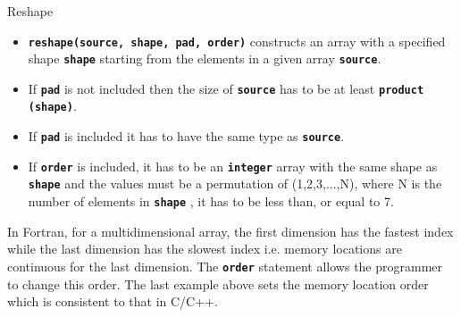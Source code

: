 \documentclass[slidestop,mathserif,compress,xcolor=svgnames]{beamer}
\newcommand{\bftt}[1]{\textbf{\texttt{#1}}}
\newenvironment{ablock}[0]
{
\begin{beamerboxesrounded}[upper=uppercol,lower=lowercol,shadow=true]}
{\end{beamerboxesrounded}}
\newenvironment{eblock}[0]
{
\begin{beamerboxesrounded}[upper=uppercol2,lower=lowercol2,shadow=true]}
{\end{beamerboxesrounded}}
\begin{document}
\begin{frame}[fragile]
  \frametitle{\small }
  \begin{block}{\scriptsize Reshape}
    \begin{itemize}
      \item \textbf{\texttt{reshape(source, shape, pad, order)}} constructs an array with a specified shape \textbf{\texttt{shape}} starting from the elements in a given array \textbf{\texttt{source}}.  
      \item If \textbf{\texttt{pad}} is not included then the size of \bftt{source} has to be at least \bftt{product (shape)}. 
      \item If \bftt{pad} is included it has to have the same type as \bftt{source}. 
      \item If \bftt{order} is included, it has to be an \bftt{integer} array with the same shape as \bftt{shape} and the values must be a permutation of (1,2,3,...,N), where N is the number of elements in \bftt{shape} , it has to be less than, or equal to 7.
    \end{itemize}
  \end{block}
  \vspace{-0.25cm}
  \begin{ablock}{}
    In Fortran, for a multidimensional array, the first dimension has the fastest index while the last dimension has the slowest index i.e. memory locations are continuous for the last dimension. 
    The \bftt{order} statement allows the programmer to change this order. The last example above sets the memory location order which is consistent to that in C/C++.
  \end{ablock}
\end{frame}
\end{document}
